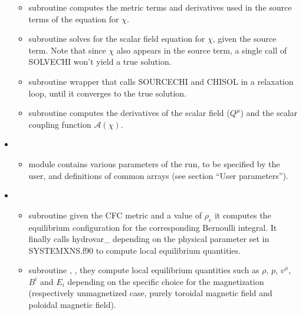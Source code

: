 \documentclass[letterpaper,10pt,english]{sphinxmanual}
\begin{document}
\begin{itemize}
\begin{itemize}
\item {} 
\sphinxAtStartPar
subroutine  \sphinxhyphen{} computes the metric terms and derivatives used in the source terms of the equation for \(\chi\).

\item {} 
\sphinxAtStartPar
subroutine  \sphinxhyphen{} solves for the scalar field equation for \(\chi\), given the source term. Note that since \(\chi\) also appears in the source term, a single call of SOLVECHI won’t yield a true solution.

\item {} 
\sphinxAtStartPar
subroutine  \sphinxhyphen{} wrapper that calls SOURCECHI and CHISOL in a relaxation loop, until it converges to the true solution.

\item {} 
\sphinxAtStartPar
subroutine  \sphinxhyphen{} computes the derivatives of the scalar field (\(Q^\mu\)) and the scalar coupling function \(\mathcal{A}(\chi)\).


\end{itemize}

\item {} 
\sphinxAtStartPar
{}
\begin{itemize}
\item {} 
\sphinxAtStartPar
module  \sphinxhyphen{} contains various parameters of the run, to be specified by the user, and definitions of common arrays (see section “User parameters”).


\end{itemize}

\item {} 
\sphinxAtStartPar
{}
\begin{itemize}
\item {} 
\sphinxAtStartPar
subroutine  \sphinxhyphen{} given the CFC metric and a value of \(\rho _\mathrm{c}\) it computes the equilibrium
configuration for the corresponding Bernoulli integral. It finally calls
hydrovar\_ depending on the physical parameter set in SYSTEMXNS.f90 to compute local
equilibrium quantities.

\item {} 
\sphinxAtStartPar
subroutine , ,  \sphinxhyphen{} they compute local equilibrium
quantities such as \(\rho\), \(p\), \(v^\phi\), \(B^i\) and \(E_i\) depending on the specific choice for the magnetization (respectively unmagnetized case, purely toroidal magnetic field and poloidal magnetic field).


\end{itemize}
\end{itemize}
\end{document}
